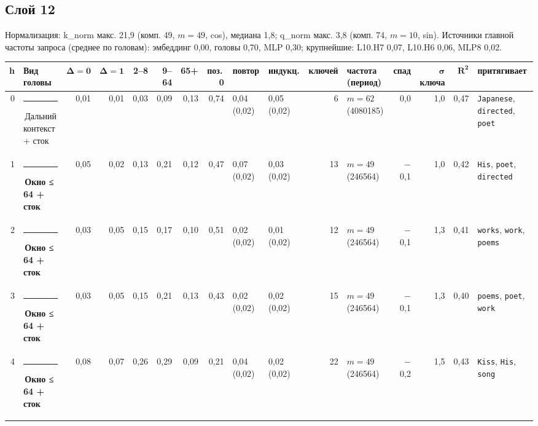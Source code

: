 \documentclass[10pt]{article}
\begin{document}
\noindent\begin{minipage}{\linewidth}
\subsection*{Слой 12}
{\small\color{ink2} Нормализация: k\_norm макс. 21,9 (комп. 49, $m{=}49$, cos), медиана 1,8; q\_norm макс. 3,8 (комп. 74, $m{=}10$, sin). Источники главной частоты запроса (среднее по головам): эмбеддинг 0,00, головы 0,70, MLP 0,30; крупнейшие: L10.H7 0,07, L10.H6 0,06, MLP8 0,02.}
\begin{center}{\footnotesize\begin{tabular}{|r|l|r|r|r|r|r|r|l|l|r|l|r|r|r|l|}
\hline
\rowcolor{head}\textbf{h} & \textbf{Вид головы} & $\boldsymbol{\Delta{=}0}$ & $\boldsymbol{\Delta{=}1}$ & \textbf{2–8} & \textbf{9–64} & \textbf{65+} & \textbf{поз.\,0} & \textbf{повтор} & \textbf{индукц.} & \textbf{ключей} & \textbf{частота (период)} & \textbf{спад} & $\boldsymbol{\sigma}$ \textbf{ключа} & $\boldsymbol{R^2}$ & \textbf{притягивает} \\ \hline
0 & \textcolor[HTML]{C3C2B7}{\rule{0.62em}{0.62em}}\,Дальний контекст + сток & 0,01 & 0,01 & 0,03 & 0,09 & 0,13 & 0,74 & 0,04 (0,02) & 0,05 (0,02) & 6 & $m{=}62$ (4080185) & 0,0 & 1,0 & 0,47 & \texttt{\textvisiblespace{}Japanese}, \texttt{\textvisiblespace{}directed}, \texttt{\textvisiblespace{}poet} \\ \hline
1 & \textcolor[HTML]{EDA100}{\rule{0.62em}{0.62em}}\,\textbf{Окно ≤ 64 + сток} & 0,05 & 0,02 & 0,13 & 0,21 & 0,12 & 0,47 & 0,07 (0,02) & 0,03 (0,02) & 13 & $m{=}49$ (246564) & $-$0,1 & 1,0 & 0,42 & \texttt{\textvisiblespace{}His}, \texttt{\textvisiblespace{}poet}, \texttt{\textvisiblespace{}directed} \\ \hline
2 & \textcolor[HTML]{EDA100}{\rule{0.62em}{0.62em}}\,\textbf{Окно ≤ 64 + сток} & 0,03 & 0,05 & 0,15 & 0,17 & 0,10 & 0,51 & 0,02 (0,02) & 0,01 (0,02) & 12 & $m{=}49$ (246564) & $-$0,1 & 1,3 & 0,41 & \texttt{\textvisiblespace{}works}, \texttt{\textvisiblespace{}work}, \texttt{\textvisiblespace{}poems} \\ \hline
3 & \textcolor[HTML]{EDA100}{\rule{0.62em}{0.62em}}\,\textbf{Окно ≤ 64 + сток} & 0,03 & 0,05 & 0,15 & 0,21 & 0,13 & 0,43 & 0,02 (0,02) & 0,02 (0,02) & 15 & $m{=}49$ (246564) & $-$0,1 & 1,3 & 0,40 & \texttt{\textvisiblespace{}poems}, \texttt{\textvisiblespace{}poet}, \texttt{\textvisiblespace{}work} \\ \hline
4 & \textcolor[HTML]{EDA100}{\rule{0.62em}{0.62em}}\,\textbf{Окно ≤ 64 + сток} & 0,08 & 0,07 & 0,26 & 0,29 & 0,09 & 0,21 & 0,04 (0,02) & 0,02 (0,02) & 22 & $m{=}49$ (246564) & $-$0,2 & 1,5 & 0,43 & \texttt{\textvisiblespace{}Kiss}, \texttt{\textvisiblespace{}His}, \texttt{\textvisiblespace{}song} \\ \hline

\end{tabular}}
\end{center}
\end{minipage}
\end{document}
